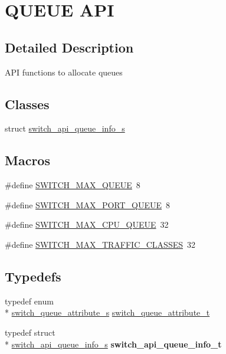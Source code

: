 \hypertarget{group__QUEUE}{\section{Q\+U\+E\+U\+E A\+P\+I}
\label{group__QUEUE}
}


\subsection{Detailed Description}
A\+P\+I functions to allocate queues \subsection*{Classes}
\begin{DoxyCompactItemize}
\item 
struct \hyperlink{structswitch__api__queue__info__s}{switch\+\_\+api\+\_\+queue\+\_\+info\+\_\+s}
\end{DoxyCompactItemize}
\subsection*{Macros}
\begin{DoxyCompactItemize}
\item 
\#define \hyperlink{group__QUEUE_gaf07e036d72e57f28e80e078d6fd09bd3}{S\+W\+I\+T\+C\+H\+\_\+\+M\+A\+X\+\_\+\+Q\+U\+E\+U\+E}~8
\item 
\#define \hyperlink{group__QUEUE_gaecd834097d78ac088d4d6765770dbeb7}{S\+W\+I\+T\+C\+H\+\_\+\+M\+A\+X\+\_\+\+P\+O\+R\+T\+\_\+\+Q\+U\+E\+U\+E}~8
\item 
\#define \hyperlink{group__QUEUE_ga3d8890e94a7bc0059c97d9ffe0338af5}{S\+W\+I\+T\+C\+H\+\_\+\+M\+A\+X\+\_\+\+C\+P\+U\+\_\+\+Q\+U\+E\+U\+E}~32
\item 
\#define \hyperlink{group__QUEUE_gad15126a3cd060722141ab50b7b81c7cf}{S\+W\+I\+T\+C\+H\+\_\+\+M\+A\+X\+\_\+\+T\+R\+A\+F\+F\+I\+C\+\_\+\+C\+L\+A\+S\+S\+E\+S}~32
\end{DoxyCompactItemize}
\subsection*{Typedefs}
\begin{DoxyCompactItemize}
\item 
typedef enum \\*
\hyperlink{group__QUEUE_ga52bffabee8ef791c8e3e0c1dd1bdd0cb}{switch\+\_\+queue\+\_\+attribute\+\_\+s} \hyperlink{group__QUEUE_ga7a4593247f7a7aa628e39211a924c141}{switch\+\_\+queue\+\_\+attribute\+\_\+t}
\item 
\hypertarget{group__QUEUE_gabe9d092ab7db84d304c85319d27343f0}{typedef struct \\*
\hyperlink{structswitch__api__queue__info__s}{switch\+\_\+api\+\_\+queue\+\_\+info\+\_\+s} {\bfseries switch\+\_\+api\+\_\+queue\+\_\+info\+\_\+t}}\label{group__QUEUE_gabe9d092ab7db84d304c85319d27343f0}

\end{DoxyCompactItemize}
